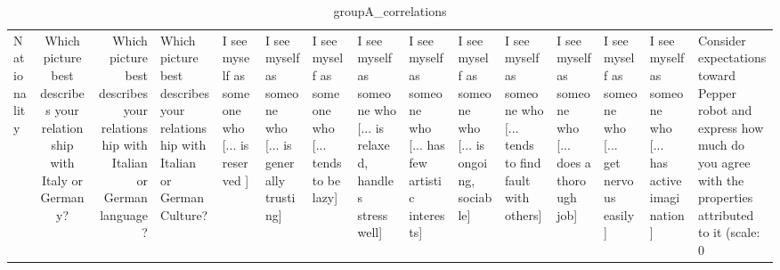 \begin{table}
\caption{groupA_correlations}
\label{tab:groupA_correlations}
\begin{tabular}{lcr}
\toprule
Nationality & Which picture best describes your relationship with Italy or Germany? & Which picture best describes your relationship with Italian or German language? & Which picture best describes your relationship with Italian or German Culture? & I see myself as someone who  [... is reserved ] & I see myself as someone who  [... is generally trusting] & I see myself as someone who  [... tends to be lazy] & I see myself as someone who  [... is relaxed, handles stress well] & I see myself as someone who  [... has few artistic interests] & I see myself as someone who  [... is ongoing, sociable] & I see myself as someone who  [... tends to find fault with others] & I see myself as someone who  [... does a thorough job] & I see myself as someone who  [... get nervous easily] & I see myself as someone who  [... has active imagination] & Consider expectations toward Pepper robot and express how much do you agree with the properties attributed to it (scale: 0%
\end{tabular}
\end{table}
